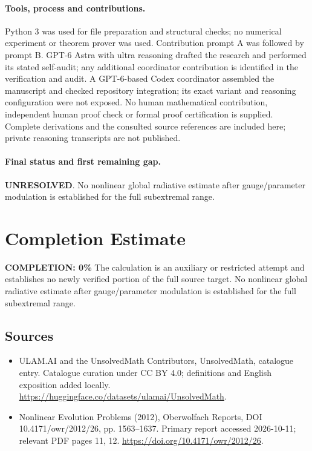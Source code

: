 \documentclass[11pt]{article}
\begin{document}
\paragraph{Tools, process and contributions.}
Python 3 was used for file preparation and structural checks; no numerical experiment or theorem prover was used. Contribution prompt A was followed by prompt B. GPT-6 Astra with ultra reasoning drafted the research and performed its stated self-audit; any additional coordinator contribution is identified in the verification and audit. A GPT-6-based Codex coordinator assembled the manuscript and checked repository integration; its exact variant and reasoning configuration were not exposed. No human mathematical contribution, independent human proof check or formal proof certification is supplied. Complete derivations and the consulted source references are included here; private reasoning transcripts are not published.

\paragraph{Final status and first remaining gap.}
\textbf{UNRESOLVED}. No nonlinear global radiative estimate after gauge/parameter modulation is established for the full subextremal range.

\section{Completion Estimate}
\noindent\textbf{COMPLETION: 0\%}
The calculation is an auxiliary or restricted attempt and establishes no newly verified portion of the full source target. No nonlinear global radiative estimate after gauge/parameter modulation is established for the full subextremal range.

\subsection{Sources}
\begin{itemize}
\item[\hypertarget{source:statement:1}{S1}] ULAM.AI and the UnsolvedMath Contributors, UnsolvedMath, catalogue entry. Catalogue curation under CC BY 4.0; definitions and English exposition added locally.
\url{https://huggingface.co/datasets/ulamai/UnsolvedMath}.
\item[\hypertarget{source:statement:2}{S2}] Nonlinear Evolution Problems (2012), Oberwolfach Reports, DOI 10.4171/owr/2012/26, pp. 1563--1637. Primary report accessed 2026-10-11; relevant PDF pages 11, 12.
\url{https://doi.org/10.4171/owr/2012/26}.
\end{itemize}
\label{end:statement}
\end{document}
